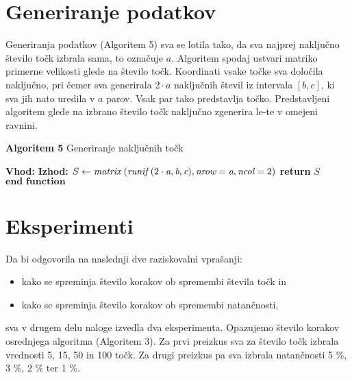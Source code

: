 \documentclass[12pt,a4paper]{amsart}
\theoremstyle{definition} %
\theoremstyle{plain} %
\begin{document}
\section{Generiranje podatkov}

Generiranja podatkov (Algoritem 5) sva se lotila tako, da sva najprej naključno število točk izbrala sama, to označuje $a$. Algoritem spodaj ustvari matriko primerne velikosti glede na število točk. Koordinati vsake točke sva določila naključno, pri čemer sva generirala $2 \cdot a$ naključnih števil iz intervala $[b, c]$, ki sva jih nato uredila v $a$ parov. Vsak par tako predstavlja točko. Predstavljeni algoritem glede na izbrano število točk naključno zgenerira le-te v omejeni ravnini.

\begin{algorithm}[H]
\caption{\textbf{Algoritem 5} Generiranje naključnih točk}\label{generiranje}
\begin{algorithmic}[1]
\Statex\textbf{Vhod:} 
\Statex\textbf{Izhod:} 
\State $S \gets \textit{matrix}\hspace{1mm}(\textit{runif} \hspace{1mm} (2 \cdot \textit{a}, \textit{b}, \textit{c}), \textit{nrow} = \textit{a}, \textit{ncol} = 2)$
\State \textbf{return} $\textit{S}$ \\
$\textbf{end function}$
\EndFunction
\end{algorithmic}
\end{algorithm}

\section{Eksperimenti}

Da bi odgovorila na naslednji dve raziskovalni vprašanji:
\begin{itemize}
\item{kako se spreminja število korakov ob spremembi števila točk in}
\item{kako se spreminja število korakov ob spremembi natančnosti,}
\end{itemize}
sva v drugem delu naloge izvedla dva eksperimenta. Opazujemo število korakov osrednjega algoritma (Algoritem 3). Za prvi preizkus sva za število točk izbrala vrednosti 5, 15, 50 in 100 točk. Za drugi preizkus pa sva izbrala natančnosti 5 \%, 3 \%, 2 \% ter 1 \%.
\end{document}
